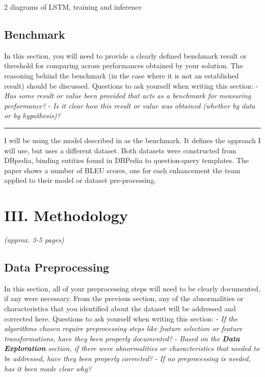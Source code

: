 \documentclass[12pt]{article}
\begin{document}
2 diagrams of LSTM, training and inference

\subsection{Benchmark}\label{benchmark}

In this section, you will need to provide a clearly defined benchmark
result or threshold for comparing across performances obtained by your
solution. The reasoning behind the benchmark (in the case where it is
not an established result) should be discussed. Questions to ask
yourself when writing this section: - \emph{Has some result or value
been provided that acts as a benchmark for measuring performance?} -
\emph{Is it clear how this result or value was obtained (whether by data
or by hypothesis)?}

\begin{center}\rule{0.5\linewidth}{\linethickness}\end{center}

I will be using the model described in \cite{soru2018neural} as the
benchmark. It defines the approach I will use, but uses a different
dataset. Both datasets were constructed from DBpedia, binding entities
found in DBPedia to question-query templates. The paper shows a number
of BLEU scores, one for each enhancement the team applied to their model
or dataset pre-processing.

\section{III. Methodology}\label{iii.-methodology}

\emph{(approx. 3-5 pages)}

\subsection{Data Preprocessing}\label{data-preprocessing}

In this section, all of your preprocessing steps will need to be clearly
documented, if any were necessary. From the previous section, any of the
abnormalities or characteristics that you identified about the dataset
will be addressed and corrected here. Questions to ask yourself when
writing this section: - \emph{If the algorithms chosen require
preprocessing steps like feature selection or feature transformations,
have they been properly documented?} - \emph{Based on the \textbf{Data
Exploration} section, if there were abnormalities or characteristics
that needed to be addressed, have they been properly corrected?} -
\emph{If no preprocessing is needed, has it been made clear why?}
\end{document}
